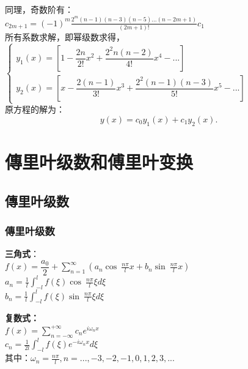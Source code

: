 \begin{frame}	
	同理，奇数阶有：\\
	{ $\displaystyle
		c_{2m+1} = (-1) ^m \frac{2^m (n-1) (n-3)(n-5)...(n-2m+1)  } {(2m+1)!} c_1$}\\ \vspace{0.3cm}
	所有系数求解，即幂级数求得，\\
	$\displaystyle \begin{cases}
		y_1(x)  = [1- \dfrac{2n}{2!} x^2+ \dfrac{2^2n(n-2)}{4!} x^4 -...  ] \\
		y_2(x)  = [x- \dfrac{2(n-1)}{3!} x^3+ \dfrac{2^2(n-1)(n-3) }{5!}x^5 -...  ]
	\end{cases}$ \\ \vspace{0.3cm}
	原方程的解为：
	\begin{equation*}
		y(x) =c_0y_1(x)+c_1 y_2(x).
	\end{equation*}   
\end{frame}

\section{傳里叶级数和傅里叶变换}
\subsection{傳里叶级数 }

\begin{frame}
\frametitle{傳里叶级数}
	\textbf{\large 三角式}：\\
	{\large  $\displaystyle f(x) =\dfrac{a_0}{2} +\sum_{n=1}^{\infty}  \left(  a_n \cos~ \frac{n\pi}{l} x +  b_n \sin~ \frac{n\pi}{l} x  \right) $ }\\	
	{\large $\displaystyle a_n =\frac{1}{l}  \int_{-l}^{l}  f(\xi )   \cos~ \frac{n\pi}{l} \xi d\xi  $ }\\	
	{\large $\displaystyle b_n =\frac{1}{l}  \int_{-l}^{l}  f(\xi )   \sin~ \frac{n\pi}{l} \xi d\xi   $ }\\	
\end{frame}

\begin{frame}
	\textbf{ \large 复数式：} \\  
	{\large  $\displaystyle f(x) =\sum_{n=-\infty}^{+\infty}  c_n e^{i\omega_n x} $ }\\	
	{\large $\displaystyle c_n =\frac{1}{2l}  \int_{-l}^{l}  f(\xi)    e^{-i\omega_n x}  d\xi  $ }\\	
	其中：{\large $\displaystyle   \omega_n=\frac{n\pi}{l} ,  n=...,-3,-2,-1,0,1,2,3,...   $} \\
\end{frame}

